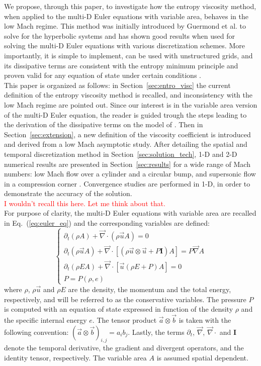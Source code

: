 \documentclass[preprint,10pt]{elsarticle}
\renewcommand{\div}{\vec{\nabla}\! \cdot \!}
\newcommand{\grad}{\vec{\nabla}}
\newcommand{\eqt}[1]{Eq.~(\ref{#1})}                     %
\newcommand{\sct}[1]{Section~\ref{#1}}                   %
\newcommand{\tcr}[1]{\textcolor{red}{#1}}
\begin{document}
We propose, through this paper, to investigate how the entropy viscosity method, when applied to the multi-D Euler equations with variable area, behaves in the low Mach regime. This method was initially introduced by Guermond et al. to solve for the hyperbolic systems and has shown good results when used for solving the multi-D Euler equations with various discretization schemes. More importantly, it is simple to implement, can be used with unstructured grids,  and its dissipative terms are consistent with the entropy minimum principle and proven valid for any equation of state under certain conditions \cite{jlg}. \\
This paper is organized as follows: in \sct{sec:entro_visc} the current definition of the entropy viscosity method is recalled, and inconsistency with the low Mach regime are pointed out. Since our interest is in the variable area version of the multi-D Euler equation, the reader is guided trough the steps leading to the derivation of the dissipative terms on the model of \cite{jlg}. Then in \sct{sec:extension}, a new definition of the viscosity coefficient is introduced and derived from a low Mach asymptotic study. After detailing the spatial and temporal discretization method in \sct{sec:solution_tech}, 1-D and 2-D numerical results are presented in \sct{sec:results} for a wide range of Mach numbers: low Mach flow over a cylinder and a circular bump, and supersonic flow in a compression corner \cite{CompressionCorner}. Convergence studies are performed in 1-D, in order to demonstrate the accuracy of the solution. \\
\tcr{I wouldn't recall this here. Let me think about that.}\\
For purpose of clarity, the multi-D Euler equations with variable area are recalled in \eqt{eq:euler_eq} and the corresponding variables are defined:
%
\begin{equation}
\label{eq:euler_eq}
\left\{ 
\begin{array}{lll}
\partial_t \left( \rho A\right) + \div \left( \rho \vec{u} A\right) = 0\\
\partial_t \left( \rho \vec{u} A\right) + \div \left[ \left( \rho \vec{u} \otimes \vec{u} + P \mathbf{I} \right) A \right] = P \grad A\\
\partial_t \left( \rho E A\right) + \div \left[ \vec{u} \left( \rho E + P \right) A\right] = 0 \\
P = P\left( \rho, e \right)
\end{array}
\right.
\end{equation}
%
where $\rho$, $\rho \vec{u}$ and $\rho E$ are the density, the momentum and the total energy, respectively, and will be referred to as the conservative variables. The pressure $P$ is computed with an equation of state expressed in function of the density $\rho$ and the specific internal energy $e$. The tensor product $\vec{a} \otimes \vec{b}$ is taken with the following convention: $(\vec{a} \otimes \vec{b})_{i,j} = a_i b_j$. Lastly, the terms $\partial_t$, $\grad$, $\div$ and $\mathbf{I}$ denote the temporal derivative, the gradient and divergent operators, and the identity tensor, respectively. The variable area $A$ is assumed spatial dependent.
\end{document}
